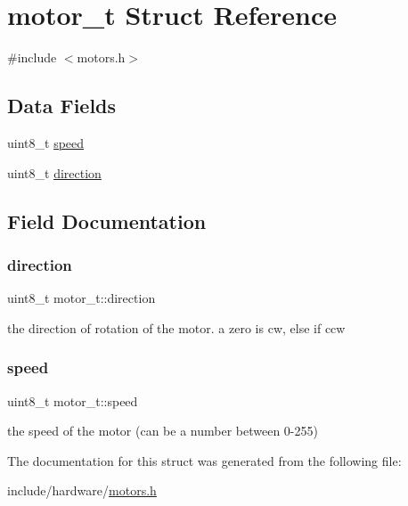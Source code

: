 \hypertarget{structmotor__t}{}\section{motor\+\_\+t Struct Reference}
\label{structmotor__t}


{\ttfamily \#include $<$motors.\+h$>$}

\subsection*{Data Fields}
\begin{DoxyCompactItemize}
\item 
uint8\+\_\+t \hyperlink{structmotor__t_ab457d71ecef90c4a5bae83f96689d4fd}{speed}
\item 
uint8\+\_\+t \hyperlink{structmotor__t_ac14914d6c6a48f5762dad1cc9f74268d}{direction}
\end{DoxyCompactItemize}


\subsection{Field Documentation}
\mbox{\label{structmotor__t_ac14914d6c6a48f5762dad1cc9f74268d}} 
\subsubsection{\texorpdfstring{direction}{direction}}
{\footnotesize\ttfamily uint8\+\_\+t motor\+\_\+t\+::direction}

the direction of rotation of the motor. a zero is cw, else if ccw \mbox{\label{structmotor__t_ab457d71ecef90c4a5bae83f96689d4fd}} 
\subsubsection{\texorpdfstring{speed}{speed}}
{\footnotesize\ttfamily uint8\+\_\+t motor\+\_\+t\+::speed}

the speed of the motor (can be a number between 0-\/255) 

The documentation for this struct was generated from the following file\+:\begin{DoxyCompactItemize}
\item 
include/hardware/\hyperlink{motors_8h}{motors.\+h}\end{DoxyCompactItemize}
